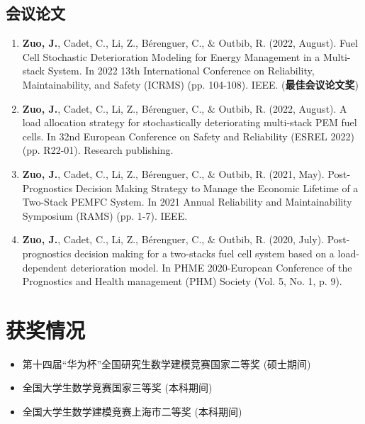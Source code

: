 \documentclass{resume}
\begin{document}
\subsection{会议论文}
\begin{enumerate}
    \item \textbf{Zuo, J.}, Cadet, C., Li, Z., Bérenguer, C., $\&$ Outbib, R. (2022, August). Fuel Cell Stochastic Deterioration Modeling for Energy Management in a Multi-stack System. In 2022 13th International Conference on Reliability, Maintainability, and Safety (ICRMS) (pp. 104-108). IEEE. (\textbf{最佳会议论文奖})
    \item \textbf{Zuo, J.}, Cadet, C., Li, Z., Bérenguer, C., $\&$ Outbib, R. (2022, August). A load allocation strategy for stochastically deteriorating multi-stack PEM fuel cells. In 32nd European Conference on Safety and Reliability (ESREL 2022) (pp. R22-01). Research publishing.
    \item \textbf{Zuo, J.}, Cadet, C., Li, Z., Bérenguer, C., $\&$ Outbib, R. (2021, May). Post-Prognostics Decision Making Strategy to Manage the Economic Lifetime of a Two-Stack PEMFC System. In 2021 Annual Reliability and Maintainability Symposium (RAMS) (pp. 1-7). IEEE.
    \item  \textbf{Zuo, J.}, Cadet, C., Li, Z., Bérenguer, C., $\&$ Outbib, R. (2020, July). Post-prognostics decision making for a two-stacks fuel cell system based on a load-dependent deterioration model. In PHME 2020-European Conference of the Prognostics and Health management (PHM) Society (Vol. 5, No. 1, p. 9).
\end{enumerate}

\section{获奖情况}
\begin{itemize}
    \item 第十四届``华为杯''全国研究生数学建模竞赛国家二等奖 (硕士期间)
    \item 全国大学生数学竞赛国家三等奖 (本科期间)
    \item 全国大学生数学建模竞赛上海市二等奖 (本科期间)
\end{itemize}
\end{document}
